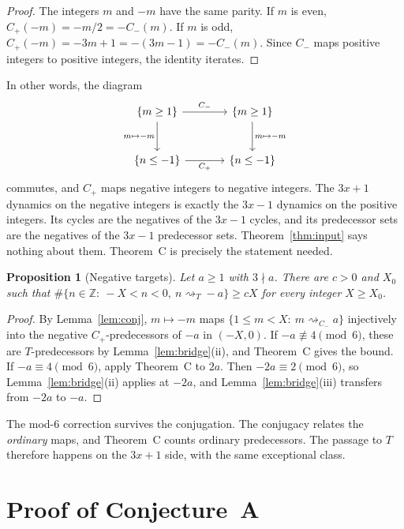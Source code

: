\documentclass[11pt]{amsart}
\newtheorem{proposition}[theorem]{Proposition}
\theoremstyle{definition}
\theoremstyle{remark}
\newcommand{\Z}{\mathbb{Z}}
\newcommand{\Cp}{C_{+}}
\newcommand{\Cm}{C_{-}}
\newcommand{\reach}[1]{\mathrel{\rightsquigarrow_{#1}}}
\begin{document}
\begin{proof}
The integers $m$ and $-m$ have the same parity. If $m$ is even, $\Cp(-m)=-m/2=-\Cm(m)$. If $m$ is
odd, $\Cp(-m)=-3m+1=-(3m-1)=-\Cm(m)$. Since $\Cm$ maps positive integers to positive integers, the
identity iterates.
\end{proof}

In other words, the diagram
\[
\begin{tikzcd}[column sep=large,row sep=large]
\{m\ge1\} \arrow[r,"\Cm"] \arrow[d,"m\mapsto -m"'] & \{m\ge1\} \arrow[d,"m\mapsto -m"] \\
\{n\le-1\} \arrow[r,"\Cp"'] & \{n\le-1\}
\end{tikzcd}
\]
commutes, and $\Cp$ maps negative integers to negative integers. The $3x+1$ dynamics on the
negative integers is exactly the $3x-1$ dynamics on the positive integers. Its cycles are the
negatives of the $3x-1$ cycles, and its predecessor sets are the negatives of the $3x-1$ predecessor
sets. Theorem~\ref{thm:input} says nothing about them. Theorem~C is precisely the statement needed.

\begin{proposition}[Negative targets]\label{prop:neg}
Let $a\ge1$ with $3\nmid a$. There are $c>0$ and $X_0$ such that
$\#\{n\in\Z:\ -X<n<0,\ n\reach{T}-a\}\ge cX$ for every integer $X\ge X_0$.
\end{proposition}

\begin{proof}
By Lemma~\ref{lem:conj}, $m\mapsto-m$ maps $\{1\le m<X:\ m\reach{\Cm}a\}$ injectively into the
negative $\Cp$-predecessors of $-a$ in $(-X,0)$. If $-a\not\equiv4\pmod6$, these are
$T$-predecessors by Lemma~\ref{lem:bridge}(ii), and Theorem~C gives the bound. If
$-a\equiv4\pmod6$, apply Theorem~C to $2a$. Then $-2a\equiv2\pmod6$, so
Lemma~\ref{lem:bridge}(ii) applies at $-2a$, and Lemma~\ref{lem:bridge}(iii) transfers from $-2a$
to $-a$.
\end{proof}

The mod-$6$ correction survives the conjugation. The conjugacy relates the \emph{ordinary} maps, and
Theorem~C counts ordinary predecessors. The passage to $T$ therefore happens on the $3x+1$ side,
with the same exceptional class.

\section{Proof of Conjecture~A}\label{sec:proofA}
\end{document}
